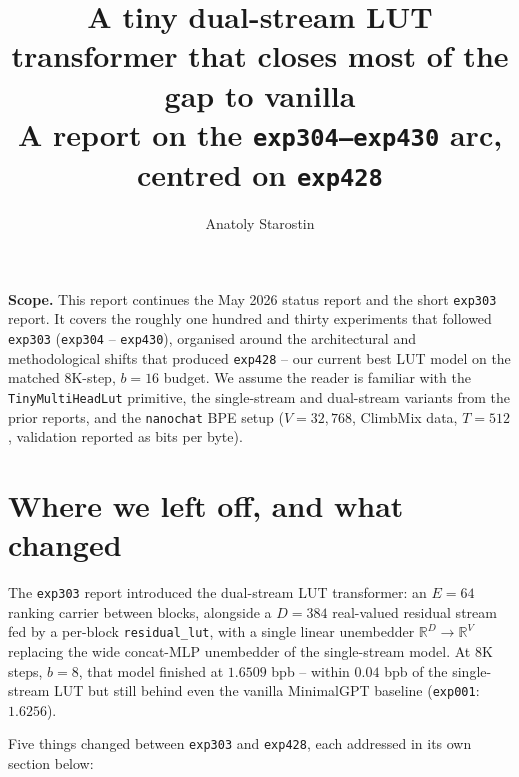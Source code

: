 \documentclass[11pt]{article}
\begin{document}
\title{\Large\textbf{A tiny dual-stream LUT transformer that closes most of the gap to vanilla}\\[2pt]
\large A report on the \texttt{exp304--exp430} arc, centred on \texttt{exp428}}
\author{Anatoly Starostin}
\date{}
\maketitle
\vspace{-12pt}

\noindent\textbf{Scope.}
This report continues the May 2026 status report and the short \texttt{exp303} report.
It covers the roughly one hundred and thirty experiments that followed \texttt{exp303} (\texttt{exp304} -- \texttt{exp430}), organised around the architectural and methodological shifts that produced \texttt{exp428} -- our current best LUT model on the matched 8K-step, $b{=}16$ budget.
We assume the reader is familiar with the \texttt{TinyMultiHeadLut} primitive, the single-stream and dual-stream variants from the prior reports, and the \texttt{nanochat} BPE setup ($V{=}32{,}768$, ClimbMix data, $T{=}512$, validation reported as bits per byte).

\section{Where we left off, and what changed}
\label{sec:context}

The \texttt{exp303} report introduced the dual-stream LUT transformer: an $E{=}64$ ranking carrier between blocks, alongside a $D{=}384$ real-valued residual stream fed by a per-block \texttt{residual\_lut}, with a single linear unembedder $\mathbb{R}^D \to \mathbb{R}^V$ replacing the wide concat-MLP unembedder of the single-stream model.
At 8K steps, $b{=}8$, that model finished at $1.6509$ bpb -- within $0.04$ bpb of the single-stream LUT but still behind even the vanilla MinimalGPT baseline (\texttt{exp001}: $1.6256$).

Five things changed between \texttt{exp303} and \texttt{exp428}, each addressed in its own section below:
\end{document}
